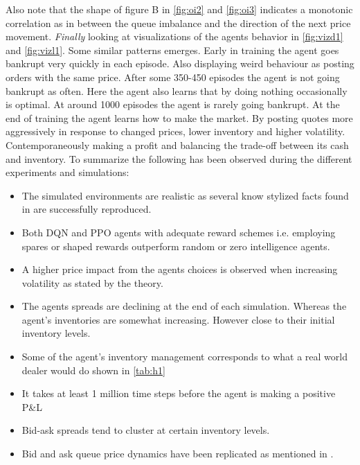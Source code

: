 \documentclass{kththesis}
\theoremstyle{definition}
\begin{document}
\newpage
Also note that the shape of figure B in \autoref{fig:oi2} and \autoref{fig:oi3} indicates a monotonic correlation as in \parencite{bouchaud2018trades} between the queue imbalance and the direction of the next price movement. \textit{Finally} looking at visualizations of the agents behavior in \autoref{fig:vizd1} and \autoref{fig:vizl1}. Some similar patterns emerges. Early in training the agent goes bankrupt very quickly in each episode. Also displaying weird behaviour as posting orders with the same price. After some 350-450 episodes the agent is not going bankrupt as often. 
\newline
\newline
Here the agent also learns that by doing nothing occasionally is optimal. At around 1000 episodes the agent is rarely going bankrupt. At the end of training the agent learns how to make the market. By posting quotes more aggressively in response to changed prices, lower inventory and higher volatility. Contemporaneously making a profit and balancing the trade-off between its cash and inventory. To summarize the following has been observed during the different experiments and simulations:
\begin{itemize}
    \item The simulated environments are realistic as several know stylized facts found in\parencite{cont2001empirical} are successfully reproduced. 
    
    \item Both DQN and PPO agents with adequate reward schemes i.e. employing spares or shaped rewards outperform random or zero intelligence agents.
    
    \item A  higher price impact from the agents choices is observed when increasing volatility as stated by the theory.
    
    \item The agents spreads are declining at the end of each simulation. Whereas the agent's inventories are somewhat increasing. However close to their initial inventory levels.
    
    \item Some of the agent's inventory management corresponds to what a real world dealer would do shown in \autoref{tab:h1}
    
    \item It takes at least 1 million time steps before the agent is making a positive P\&L
    
    \item Bid-ask spreads tend to cluster at certain inventory levels.
    
    \item Bid and ask queue price dynamics have been replicated as mentioned in \parencite{bouchaud2018trades}.
\end{itemize}
\end{document}
